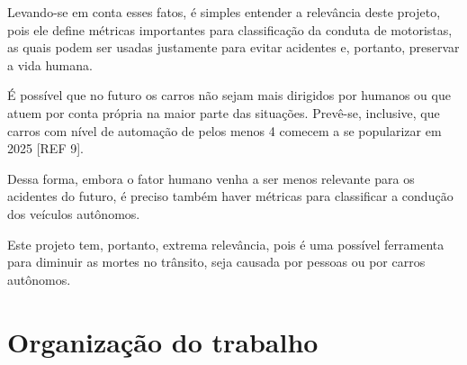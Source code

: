 Levando-se em conta esses fatos, é simples entender a relevância deste projeto, pois ele define métricas importantes para classificação da conduta de motoristas, as quais podem ser usadas justamente para evitar acidentes e, portanto, preservar a vida humana.

É possível que no futuro os carros não sejam mais dirigidos por humanos ou que atuem por conta própria na maior parte das situações. Prevê-se, inclusive, que carros com nível de automação de pelos menos 4 comecem a se popularizar em 2025 [REF 9].

Dessa forma, embora o fator humano venha a ser menos relevante para os acidentes do futuro, é preciso também haver métricas para classificar a condução dos veículos autônomos.

Este projeto tem, portanto, extrema relevância, pois é uma possível ferramenta para diminuir as mortes no trânsito, seja causada por pessoas ou por carros autônomos.

\section{Organização do trabalho}





